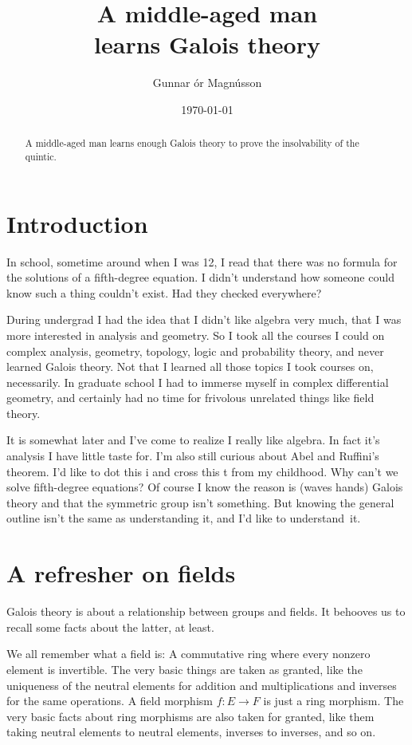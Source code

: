\documentclass[11pt]{amsart}
\title[Galois theory]{A middle-aged man\\learns Galois theory}
\author{Gunnar \TH\'or Magn\'usson}
\date{\today}
\theoremstyle{definition}
\begin{document}
\begin{abstract}
A middle-aged man learns enough Galois theory to prove the insolvability of the quintic.
\end{abstract}


\maketitle



\section*{Introduction}

In school, sometime around when I was 12, I read that there was no formula for the solutions of a fifth-degree equation.
I didn't understand how someone could know such a thing couldn't exist.
Had they checked everywhere?

During undergrad I had the idea that I didn't like algebra very much, that I was more interested in analysis and geometry.
So I took all the courses I could on complex analysis, geometry, topology, logic and probability theory, and never learned Galois theory.
Not that I learned all those topics I took courses on, necessarily.
In graduate school I had to immerse myself in complex differential geometry, and certainly had no time for frivolous unrelated things like field theory.

It is somewhat later and I've come to realize I really like algebra.
In fact it's analysis I have little taste for.
I'm also still curious about Abel and Ruffini's theorem.
I'd like to dot this i and cross this t from my childhood.
Why can't we solve fifth-degree equations?
Of course I know the reason is (waves hands) Galois theory and that the symmetric group isn't something.
But knowing the general outline isn't the same as understanding it, and I'd like to understand~it.%



\section{A refresher on fields}

Galois theory is about a relationship between groups and fields.
It behooves us to recall some facts about the latter, at least.

We all remember what a field is:
A commutative ring where every non\-zero element is invertible.
The very basic things are taken as granted, like the uniqueness of the neutral elements for addition and multiplications and inverses for the same operations.
A field morphism $f : E \to F$ is just a ring morphism.
The very basic facts about ring morphisms are also taken for granted, like them taking neutral elements to neutral elements, inverses to inverses, and so on.
\end{document}
